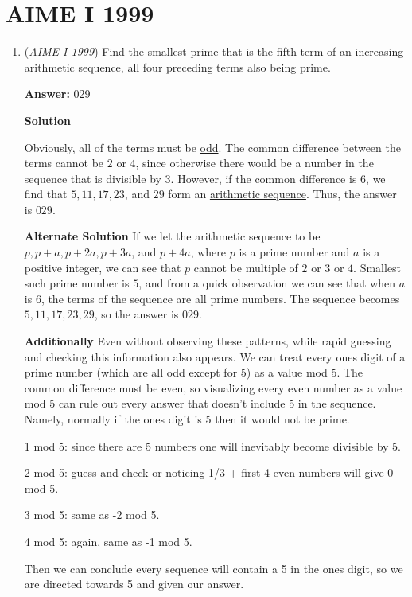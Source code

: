 \section{AIME I 1999}
        \begin{enumerate}
        	\item (\textit{AIME I 1999}) Find the smallest prime that is the fifth term of an increasing arithmetic sequence, all four preceding terms also being prime.


 
 \textbf{Answer: }029



\textbf{Solution}

Obviously, all of the terms must be \href{https://artofproblemsolving.com/wiki/index.php?title=Odd}{odd}. The common difference between the terms cannot be $2$ or $4$, since otherwise there would be a number in the sequence that is divisible by $3$. However, if the common difference is $6$, we find that $5,11,17,23$, and $29$ form an \href{https://artofproblemsolving.com/wiki/index.php?title=Arithmetic\_sequence}{arithmetic sequence}. Thus, the answer is $029$.

 \textbf{Alternate Solution} If we let the arithmetic sequence to be $p, p+a, p+2a, p+3a$, and $p+4a$, where $p$ is a prime number and $a$ is a positive integer, we can see that $p$ cannot be multiple of $2$ or $3$ or $4$. Smallest such prime number is $5$, and from a quick observation we can see that when $a$ is $6$, the terms of the sequence are all prime numbers. The sequence becomes $5, 11, 17, 23, 29$, so the answer is $029$.

 \textbf{Additionally} Even without observing these patterns, while rapid guessing and checking this information also appears. We can treat every ones digit of a prime number (which are all odd except for 5) as a value mod 5. The common difference must be even, so visualizing every even number as a value mod 5 can rule out every answer that doesn't include 5 in the sequence. Namely, normally if the ones digit is 5 then it would not be prime.

 
1 mod 5: since there are 5 numbers one will inevitably become divisible by 5.

 2 mod 5: guess and check or noticing 1/3 + first 4 even numbers will give 0 mod 5.

 3 mod 5: same as -2 mod 5.

 4 mod 5: again, same as -1 mod 5.

 
Then we can conclude every sequence will contain a 5 in the ones digit, so we are directed towards 5 and given our answer.


\end{enumerate}
